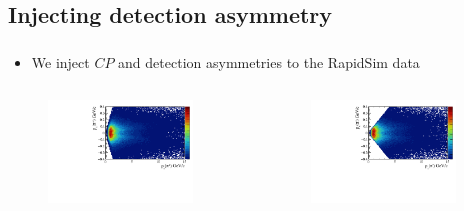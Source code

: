 \documentclass{beamer}
\begin{document}
\subsection{Injecting detection asymmetry}
\begin{frame}
      \frametitle{\insertsubsectionhead}
      \begin{itemize}
            \item We inject $CP$ and detection asymmetries to the RapidSim data
      \end{itemize}
      \begin{columns}
                  \begin{figure}
                        \centering
                        \includegraphics[width = 0.9\textwidth]{../work/RapidSimAnalysis/MomentumDependence/Plots/KK_Dst_PXPZ_Positive.pdf}
                  \end{figure}
            
                  \begin{figure}
                        \centering
                        \includegraphics[width = 0.9\textwidth]{../work/RapidSimAnalysis/MomentumDependence/Plots/KK_Dst_PXPZ_Negative.pdf}
                  \end{figure}


\end{columns}
\end{frame}
\end{document}
